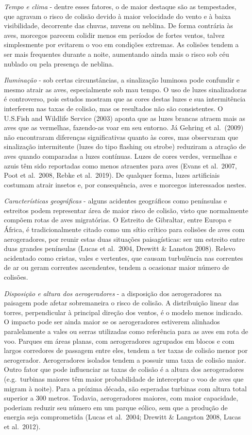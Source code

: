 \documentclass[
  oneside]{scrbook}
\begin{document}
\emph{Tempo e clima} - dentre esses fatores, o de maior destaque são as tempestades, que agravam o risco de colisão devido à maior velocidade do vento e à baixa visibilidade, decorrente das chuvas, nuvens ou neblina. De forma contrária às aves, morcegos parecem colidir menos em períodos de fortes ventos, talvez simplesmente por evitarem o voo em condições extremas. As colisões tendem a ser mais frequentes durante a noite, aumentando ainda mais o risco sob céu nublado ou pela presença de neblina.

\emph{Iluminação} - sob certas circunstâncias, a sinalização luminosa pode confundir e mesmo atrair as aves, especialmente sob mau tempo. O uso de luzes sinalizadoras é controverso, pois estudos mostram que as cores destas luzes e sua intermitência interferem nas taxas de colisão, mas os resultados não são consistentes. O U.S.Fish and Wildlife Service (2003) aponta que as luzes brancas atraem mais as aves que as vermelhas, fazendo-as voar em seu entorno. Já Gehring et al.~(2009) não encontraram diferenças significativas quanto às cores, mas observaram que sinalização intermitente (luzes do tipo flashing ou strobe) reduziram a atração de aves quando comparadas a luzes contínuas. Luzes de cores verdes, vermelhas e azuis têm sido reportadas como menos atraentes para aves (Evans et al.~2007, Poot et al.~2008, Rebke et al.~2019). De qualquer forma, luzes artificiais costumam atrair insetos e, por consequência, aves e morcegos interessados nestes.

\emph{Características geográficas} - alguns acidentes geográficos como penínsulas e estreitos podem representar área de maior risco de colisão, visto que normalmente compõem rotas de aves migratórias. O Estreito de Gibraltar, entre Europa e África, é tradicionalmente citado como um sítio crítico para colisões de aves com aerogeradores, por reunir estas duas situações paisagísticas: ser um estreito entre duas grandes penínsulas (Lucas et al.~2004, Drewitt \& Lanston 2008). Relevo acidentado como cristas, vales e vertentes, que causam turbulência nas correntes de ar ou geram correntes ascendentes, tendem a ocasionar maior número de colisões.

\emph{Disposição e altura dos aerogeradores} - a disposição dos aerogeradores na paisagem pode afetar sobremaneira o risco de colisão. A distribuição linear das torres, perpendicular à principal direção dos ventos, é o modelo menos indicado. O impacto pode ser ainda maior se os aerogeradores estiverem alinhados paralelamente a vales ou serras utilizadas como referência para as aves em rota de voo. Parques em áreas planas, com aerogeradores agrupados em blocos e com largos corredores de passagem entre eles, tendem a ter taxas de colisão menor por aerogerador. Aerogeradores isolados tendem a possuir uma taxa de colisão maior. Outro fator que pode influenciar as taxas de colisão é a altura dos aerogeradores (e.g.~turbinas maiores têm maior probabilidade de interceptar o voo de aves que migram à noite). Para a próxima década, são esperadas turbinas com altura total superior a 300 metros. Todavia, aerogeradores maiores, com maior capacidade, poderiam reduzir seu número em um parque eólico, sem que a produção de energia seja comprometida (Lucas et al.~2004; Drewitt \& Langston 2008, Lucas et al.~2012).
\end{document}
